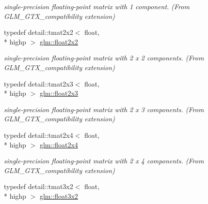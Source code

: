 \begin{DoxyCompactItemize}
\begin{DoxyCompactList}\small\item\em single-\/precision floating-\/point matrix with 1 component. (From G\-L\-M\-\_\-\-G\-T\-X\-\_\-compatibility extension) \end{DoxyCompactList}\item 
\hypertarget{group__gtx__compatibility_gaa4a1e4449913b2437f12434ed713dd73}{typedef detail\-::tmat2x2$<$ float, \\*
highp $>$ \hyperlink{group__gtx__compatibility_gaa4a1e4449913b2437f12434ed713dd73}{glm\-::float2x2}}\label{group__gtx__compatibility_gaa4a1e4449913b2437f12434ed713dd73}

\begin{DoxyCompactList}\small\item\em single-\/precision floating-\/point matrix with 2 x 2 components. (From G\-L\-M\-\_\-\-G\-T\-X\-\_\-compatibility extension) \end{DoxyCompactList}\item 
\hypertarget{group__gtx__compatibility_gaf6c91675c075853da392b1d2dfc45f65}{typedef detail\-::tmat2x3$<$ float, \\*
highp $>$ \hyperlink{group__gtx__compatibility_gaf6c91675c075853da392b1d2dfc45f65}{glm\-::float2x3}}\label{group__gtx__compatibility_gaf6c91675c075853da392b1d2dfc45f65}

\begin{DoxyCompactList}\small\item\em single-\/precision floating-\/point matrix with 2 x 3 components. (From G\-L\-M\-\_\-\-G\-T\-X\-\_\-compatibility extension) \end{DoxyCompactList}\item 
\hypertarget{group__gtx__compatibility_gaaff795523eb814705d3f1cc7fd3421f2}{typedef detail\-::tmat2x4$<$ float, \\*
highp $>$ \hyperlink{group__gtx__compatibility_gaaff795523eb814705d3f1cc7fd3421f2}{glm\-::float2x4}}\label{group__gtx__compatibility_gaaff795523eb814705d3f1cc7fd3421f2}

\begin{DoxyCompactList}\small\item\em single-\/precision floating-\/point matrix with 2 x 4 components. (From G\-L\-M\-\_\-\-G\-T\-X\-\_\-compatibility extension) \end{DoxyCompactList}\item 
\hypertarget{group__gtx__compatibility_ga19bcbd4d65c70cd07907b2d688bc84ed}{typedef detail\-::tmat3x2$<$ float, \\*
highp $>$ \hyperlink{group__gtx__compatibility_ga19bcbd4d65c70cd07907b2d688bc84ed}{glm\-::float3x2}}\label{group__gtx__compatibility_ga19bcbd4d65c70cd07907b2d688bc84ed}


\end{DoxyCompactItemize}

